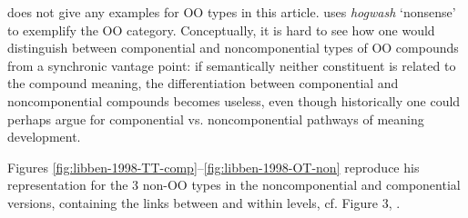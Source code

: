 \citet{Libben:1998} does not give any examples for OO types in this
article. \citet{Libbenetal:2003} uses \emph{hogwash} `nonsense' to
exemplify the OO category. Conceptually, it is hard to see how one would
distinguish between componential and noncomponential types of OO
compounds from a
synchronic vantage point: if semantically neither constituent is
related to the compound meaning, the differentiation between
componential and noncomponential compounds becomes useless, even
though historically one could perhaps argue for componential vs.
noncomponential pathways of meaning development.

\enlargethispage{3\baselineskip}
Figures \ref{fig:libben-1998-TT-comp}--\ref{fig:libben-1998-OT-non}
reproduce his representation for the 3 non-OO types in the
noncomponential and componential versions, containing the links between and
within levels, cf. Figure 3, \citet[38]{Libben:1998}.
\pagebreak

